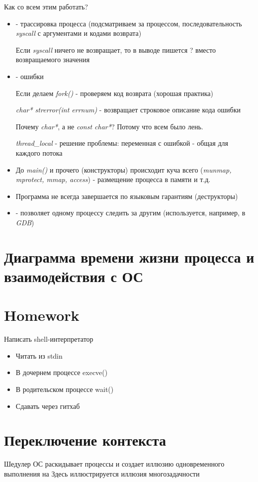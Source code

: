 \documentclass[../lectures.tex]{subfiles}
\begin{document}
Как со всем этим работать?
\begin{itemize}
    \item {} - трассировка процесса (подсматриваем за процессом, последовательность \emph{syscall} с аргументами и кодами возврата)

    Если \emph{syscall} ничего не возвращает, то в выводе пишется ? вместо возвращаемого значения

    \item {} - ошибки

    Если делаем \emph{fork()} - проверяем код возврата (хорошая практика)

    \emph{char* strerror(int errnum)} - возвращает строковое описание кода ошибки

    Почему \emph{char*}, а не \emph{const char*}? Потому что всем было лень.

    \emph{thread\_local} - решение проблемы: переменная с ошибкой - общая для каждого потока

    \item До \emph{main()} и прочего (конструкторы) происходит куча всего (\emph{munmap, mprotect, mmap, access}) - размещение процесса в памяти и т.д.

    \item Программа не всегда завершается по языковым гарантиям (деструкторы)

    \item {} - позволяет одному процессу следить за другим (используется, например, в \emph{GDB})
\end{itemize}

\section{Диаграмма времени жизни процесса и взаимодействия с ОС}

\section{Homework} 
Написать shell-интерпретатор
\begin{itemize}
    \item Читать из stdin 
    \item В дочернем процессе execve()
    \item В родительском процессе wait()
    \item Сдавать через гитхаб
\end{itemize}

\section{Переключение контекста}
Шедулер ОС раскидывает процессы и создает иллюзию одновременного выполнения на
Здесь иллюстрируется иллюзия многозадачности
\end{document}
